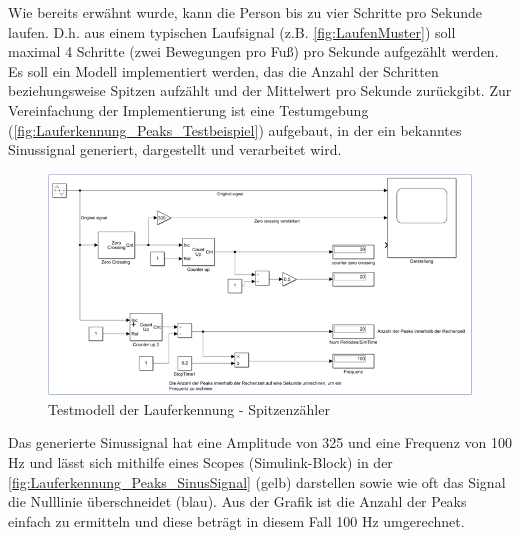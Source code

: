 Wie bereits erwähnt wurde, kann die Person bis zu vier Schritte pro Sekunde laufen. D.h. aus einem typischen Laufsignal (z.B. \autoref{fig:LaufenMuster}) soll maximal 4 Schritte (zwei Bewegungen pro Fuß) pro Sekunde aufgezählt werden.
Es soll ein Modell implementiert werden, das die Anzahl der Schritten beziehungsweise Spitzen aufzählt und der Mittelwert pro Sekunde zurückgibt. Zur Vereinfachung der Implementierung ist eine Testumgebung (\autoref{fig:Lauferkennung_Peaks_Testbeispiel}) aufgebaut, in der ein bekanntes Sinussignal generiert, dargestellt und verarbeitet wird.
\begin{figure}[H]
	\centering
	\includegraphics[width=\linewidth]{Bilder/Lauferkennung_Peaks_Testbeispiel.png} %
	\caption{Testmodell der Lauferkennung - Spitzenzähler}
	\label{fig:Lauferkennung_Peaks_Testbeispiel}
\end{figure}
Das generierte Sinussignal hat eine Amplitude von 325 und eine Frequenz von 100 Hz und lässt sich mithilfe eines Scopes (Simulink-Block) in der \autoref{fig:Lauferkennung_Peaks_SinusSignal} (gelb) darstellen sowie wie oft das Signal die Nulllinie überschneidet (blau). Aus der Grafik ist die Anzahl der Peaks einfach zu ermitteln und diese beträgt in diesem Fall 100 Hz umgerechnet. %


